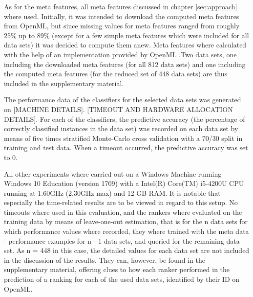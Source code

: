 
As for the meta features, all meta features discussed in chapter \ref{sec:approach} where used. Initially, it was intended to download the computed meta features from OpenML, but since missing values for meta features ranged from roughly 25\% up to 89\% (except for a few simple meta features which were included for all data sets) it was decided to compute them anew. Meta features where calculated with the help of an implementation provided by OpenML \cite{openMLEvaluationEngine}.Two data sets, one including the downloaded meta features (for all 812 data sets) and one including the computed meta features (for the reduced set of 448 data sets) are thus included in the supplementary material. 

The performance data of the classifiers for the selected data sets was generated on [MACHINE DETAILS]. [TIMEOUT AND HARDWARE ALLOCATION DETAILS]. For each of the classifiers, the predictive accuracy (the percentage of correctly classified instances in the data set) was recorded on each data set by means of five times stratified Monte-Carlo cross validation with a 70/30 split in training and test data. When a timeout occurred, the predictive accuracy was set to 0.

All other experiments where carried out on a Windows Machine running Windows 10 Education (version 1709) with a Intel(R) Core(TM) i5-4200U CPU running at 1.60GHz (2.30GHz max) and 12 GB RAM. It is notable that especially the time-related results are to be viewed in regard to this setup. No timeouts where used in this evaluation, and the rankers where evaluated on the training data by means of leave-one-out estimation, that is for the n data sets for which performance values where recorded, they where trained with the meta data - performance examples for n - 1 data sets, and queried for the remaining data set. As n = 448 in this case, the detailed values for each data set are not included in the discussion of the results. They can, however, be found in the supplementary material, offering clues to how each ranker performed in the prediction of a ranking for each of the used data sets, identified by their ID on OpenML. 

